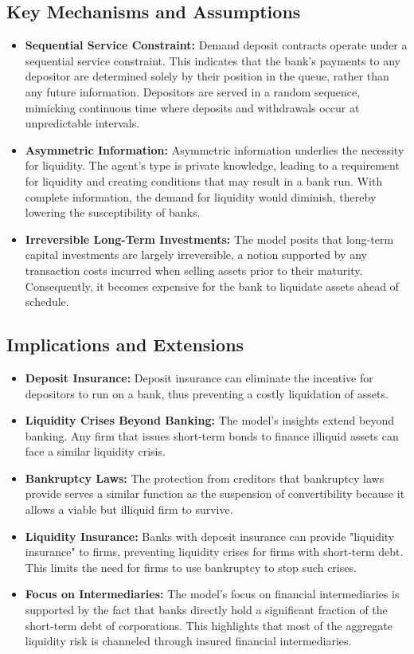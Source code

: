 \subsection{Key Mechanisms and Assumptions}
\begin{itemize}
    \item \textbf{Sequential Service Constraint:} Demand deposit contracts operate under a sequential service constraint. This indicates that the bank's payments to any depositor are determined solely by their position in the queue, rather than any future information. Depositors are served in a random sequence, mimicking continuous time where deposits and withdrawals occur at unpredictable intervals.
    \item \textbf{Asymmetric Information:} Asymmetric information underlies the necessity for liquidity. The agent's type is private knowledge, leading to a requirement for liquidity and creating conditions that may result in a bank run. With complete information, the demand for liquidity would diminish, thereby lowering the susceptibility of banks.
    \item \textbf{Irreversible Long-Term Investments:} The model posits that long-term capital investments are largely irreversible, a notion supported by any transaction costs incurred when selling assets prior to their maturity. Consequently, it becomes expensive for the bank to liquidate assets ahead of schedule.
\end{itemize}

\subsection{Implications and Extensions}
\begin{itemize}
    \item \textbf{Deposit Insurance:} Deposit insurance can eliminate the incentive for depositors to run on a bank, thus preventing a costly liquidation of assets.
    \item \textbf{Liquidity Crises Beyond Banking:} The model's insights extend beyond banking. Any firm that issues short-term bonds to finance illiquid assets can face a similar liquidity crisis.
    \item \textbf{Bankruptcy Laws:} The protection from creditors that bankruptcy laws provide serves a similar function as the suspension of convertibility because it allows a viable but illiquid firm to survive.
    \item \textbf{Liquidity Insurance:} Banks with deposit insurance can provide "liquidity insurance" to firms, preventing liquidity crises for firms with short-term debt. This limits the need for firms to use bankruptcy to stop such crises.
    \item \textbf{Focus on Intermediaries:} The model's focus on financial intermediaries is supported by the fact that banks directly hold a significant fraction of the short-term debt of corporations. This highlights that most of the aggregate liquidity risk is channeled through insured financial intermediaries.
\end{itemize}


